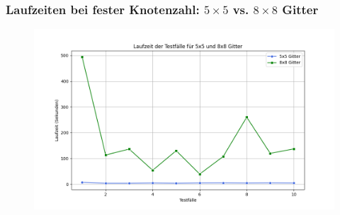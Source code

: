 \documentclass[9pt]{beamer}
\begin{document}
    \begin{frame}
    \frametitle{Laufzeiten bei fester Knotenzahl: $5\times5$ vs. $8\times8$ Gitter}
    \begin{figure}
        \centering
        \includegraphics[width=\textwidth]{figures/Laufzeit8NodesDiffOneY.png}
    \end{figure}
    \end{frame}
\end{document}
